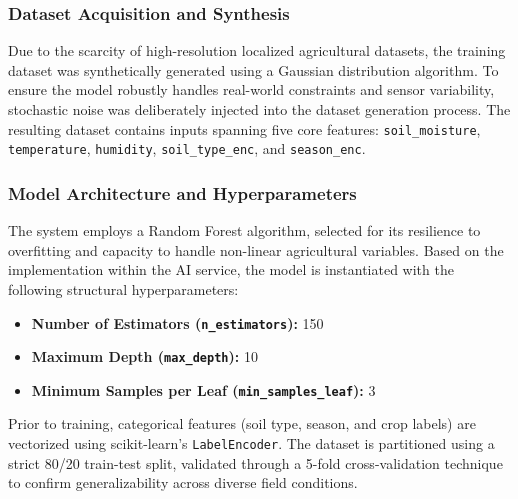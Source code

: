 \subsubsection{Dataset Acquisition and Synthesis}
Due to the scarcity of high-resolution localized agricultural datasets, the training dataset was synthetically generated using a Gaussian distribution algorithm. To ensure the model robustly handles real-world constraints and sensor variability, stochastic noise was deliberately injected into the dataset generation process. The resulting dataset contains inputs spanning five core features: \texttt{soil\_moisture}, \texttt{temperature}, \texttt{humidity}, \texttt{soil\_type\_enc}, and \texttt{season\_enc}.

\subsubsection{Model Architecture and Hyperparameters}
The system employs a Random Forest algorithm, selected for its resilience to overfitting and capacity to handle non-linear agricultural variables. Based on the implementation within the AI service, the model is instantiated with the following structural hyperparameters:
\begin{itemize}[leftmargin=1.2cm]
    \item \textbf{Number of Estimators (\texttt{n\_estimators}):} 150
    \item \textbf{Maximum Depth (\texttt{max\_depth}):} 10
    \item \textbf{Minimum Samples per Leaf (\texttt{min\_samples\_leaf}):} 3
\end{itemize}
Prior to training, categorical features (soil type, season, and crop labels) are vectorized using scikit-learn's \texttt{LabelEncoder}. The dataset is partitioned using a strict 80/20 train-test split, validated through a 5-fold cross-validation technique to confirm generalizability across diverse field conditions.

